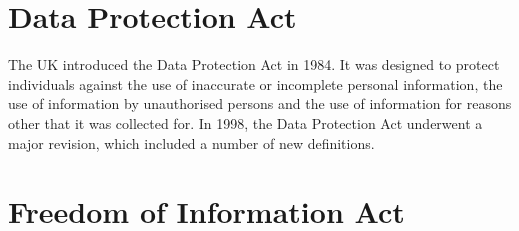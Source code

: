 \documentclass{article}
\begin{document}
	\section{Data Protection Act}
	The UK introduced the Data Protection Act in 1984. It was designed to protect individuals against the use of inaccurate or incomplete personal information, the use of information by unauthorised persons and the use of information for reasons other that it was collected for. In 1998, the Data Protection Act underwent a major revision, which included a number of new definitions.
	
	\section{Freedom of Information Act}
	
	\newpage
	\printindex	
	
\end{document}
